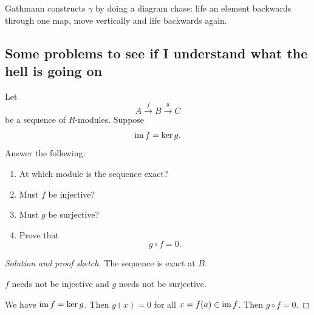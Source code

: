 \documentclass[11pt]{article}
\begin{document}
Gathmann constructs $\gamma$ by doing a diagram
chase: life an element backwards through one map, 
move vertically and life backwards again. 

\subsection{Some problems to see if I understand what the hell is going on}

\begin{prob}
    Let 
    \[
        A \overset{f}\to B \overset{g}\to C 
    \]
    be a sequence of $R$-modules. 
    Suppose 
    \[
        \operatorname{im} f = \ker g. 
    \]
    Answer the following: 
    \begin{enumerate}
        \item At which module is the sequence exact? 
        \item Must $f$ be injective? 
        \item Must $g$ be surjective? 
        \item Prove that 
            \[
                g \circ f = 0. 
            \]
    \end{enumerate}
\end{prob}
\begin{proof}[Solution and proof sketch]
    The sequence is exact at 
    $B$. 

    $f$ needs not be injective and $g$ 
    needs not be surjective. 

    We have $\operatorname{im} f = \ker g$. 
    Then $g(x) = 0$ for all $x = f(a) \in \operatorname{im} f$. 
    Then $g \circ f = 0$. 
\end{proof}
\end{document}
